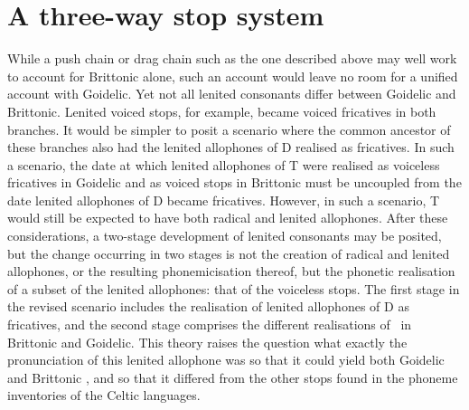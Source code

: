 \section{A three-way stop system}
\label{sec:three-way-stop}
While a push chain or drag chain such as the one described above may well work to account for Brittonic alone, such an account would leave no room for a unified account with Goidelic. Yet not all lenited consonants differ between Goidelic and Brittonic. Lenited voiced stops, for example, became voiced fricatives in both branches. It would be simpler to posit a scenario where the common ancestor of these branches also had the lenited allophones of \gls{D} realised as fricatives. In such a scenario, the date at which lenited allophones of \gls{T} were realised as voiceless fricatives in Goidelic and as voiced stops in Brittonic must be uncoupled from the date lenited allophones of \gls{D} became fricatives. However, in such a scenario, \gls{T} would still be expected to have both radical and lenited allophones.  After these considerations, a two-stage development of lenited consonants may be posited, but the change occurring in two stages is not the creation of radical and lenited allophones, or the resulting phonemicisation thereof, but the phonetic realisation of a subset of the lenited allophones: that of the voiceless stops. The first stage in the revised scenario includes the realisation of lenited allophones of \gls{D} as fricatives, and the second stage  comprises the different realisations of \lT\ in Brittonic and Goidelic. This theory raises the question what exactly the pronunciation of this lenited allophone was so that it could yield both Goidelic and Brittonic \lT, and so that it differed from the other stops found in the phoneme inventories of the Celtic languages.

